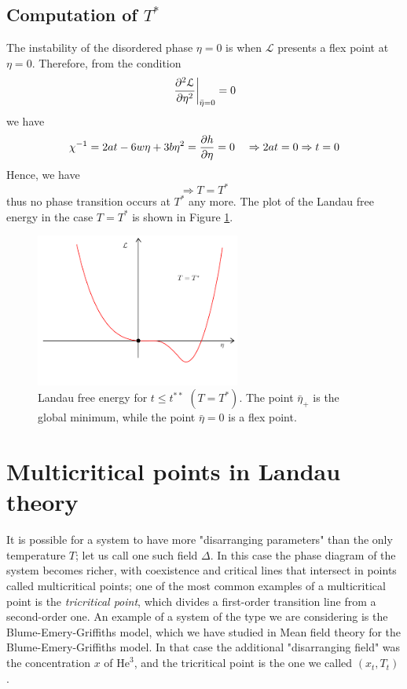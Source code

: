 \documentclass[../main/main.tex]{subfiles}
\begin{document}
\subsection{Computation of \( T^* \)}
The instability of the disordered phase \( \eta =0 \) is when \( \mathcal{L} \) presents a flex point at \( \eta =0 \). Therefore, from the condition
\begin{equation*}
    \eval{\pdv[2]{\mathcal{L}}{\eta }}_{\bar{\eta } = 0 } = 0
\end{equation*}
we have
\begin{equation*}
  \chi ^{-1} = 2 a t - 6 w \eta + 3b \eta ^2 = \pdv{h}{\eta } = 0 \quad \Rightarrow
  2 a t = 0 \Rightarrow t=0
\end{equation*}
Hence, we have
\begin{equation}
\Rightarrow T = T^*
\end{equation}
thus no phase transition occurs at \( T^* \) any more. The plot of the Landau free energy in the case \( T=T^* \) is shown in Figure \ref{fig:16_6}.

\begin{figure}[h!]
\centering
\includegraphics[width=0.6\textwidth]{../lessons/16_image/6.pdf}
\caption{\label{fig:16_6} Landau free energy for \( t\le t^{**} \) \( ( T =T^* ) \). The point \( \bar{\eta }_+   \) is the global minimum, while the point \( \bar{\eta }  = 0  \) is a flex point.}
\end{figure}





\section{Multicritical points in Landau theory}
It is possible for a system to have more "disarranging parameters" than the only temperature \( T \); let us call one such field \( \Delta  \). In this case the phase diagram of the system becomes richer, with coexistence and critical lines that intersect in points called multicritical points; one of the most common examples of a multicritical point is the \emph{tricritical point}, which divides a first-order transition line from a second-order one. An example of a system of the type we are considering is the Blume-Emery-Griffiths model, which we have studied in Mean field theory for the Blume-Emery-Griffiths model. In that case the additional "disarranging field" was the concentration \( x \)  of \( \text{He}^3 \), and the tricritical point is the one we called \( (x_t,T_t) \).
\end{document}

